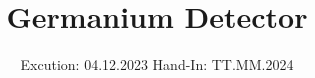 

\subject{V18}
\title{Germanium Detector}
\date{%
  Excution: 04.12.2023
  \hspace{3em}
  Hand-In: TT.MM.2024
}



\maketitle
\setcounter{page}{1}







\printbibliography{}


